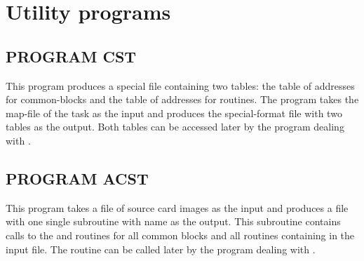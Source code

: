 
\chapter{Utility programs}
\label{sec:ap-utility-programs}

\section{PROGRAM CST}
 
This program produces a special file containing two
tables: the table of addresses for common-blocks and the
table of addresses for routines. The program takes the map-file
of the task as the input and produces the special-format file
with two tables as the output. Both tables can be
accessed later by the program dealing with \COMIS{}.
 
\section{PROGRAM ACST}
 
This program takes a file of source card images as the input
and produces a file with one single subroutine with name 
as the output. This subroutine contains calls to
the  and  routines for all
common blocks and all routines containing in the input file.
The  routine can be called later by the program dealing
with \COMIS{}.
 
